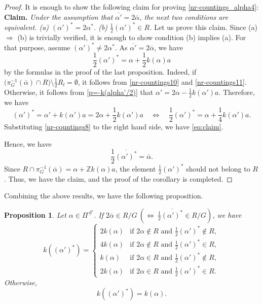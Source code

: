 \documentclass[11pt]{amsart}
\newcommand{\Z}{\mathbb{Z}}
\newcommand{\dc}{\,\underline{\mathrm{d}}^c}
\newtheorem{prop}[thm]{Proposition}%
\begin{document}
{\begin{proof}
It is enough to show the following claim for proving \eqref{nr-countings_alpha4}:
\vskip 1mm
\noindent
{\bf Claim.} {\it Under the assumption that
$\overline{\alpha'}= 2\overline{\alpha}$, 
the next two conditions are equivalent.
\vskip 1mm
\noindent
{\rm (a)} $(\alpha')^\ast=2\alpha^\ast$.
\vskip 1mm
\noindent
{\rm (b)} $\frac12 (\alpha')^\ast \in R$.} 
\vskip 3mm
\noindent
Let us prove this claim. Since (a) $\Longrightarrow$ (b) is trivially verified, it is enough 
to show condition (b) implies (a). For that purpose, assume 
$(\alpha')^\ast\ne 2\alpha^\ast$. As
$\overline{\alpha'}= 2\overline{\alpha}$, we have 
\begin{equation}\label{eq:claim}
\frac12 (\alpha')^*=\alpha+\frac12 k(\alpha)a
\end{equation}
by the formulas in the proof of the last proposition.
Indeed, if $\big(\pi_G^{-1}(\overline{\alpha})\cap R\big) \setminus \frac12 R_l=\emptyset$, it follows from \eqref{nr-countings10} and \eqref{nr-countings11}.
Otherwise, it follows from \eqref{p=-k(alpha'/2)} that
$\alpha'=2\alpha-\frac12 k(\alpha')a$. Therefore, we have
\[(\alpha')^*=\alpha'+k(\alpha')a=2\alpha+\dfrac12 k(\alpha')a\quad \Longleftrightarrow
\quad \frac12 (\alpha')^\ast=\alpha+\frac14k(\alpha')a.\]
Substituting \eqref{nr-countings8} to the right hand side, we have  
\eqref{eq:claim}. 

Hence, we have 
\[\frac12\overline{(\alpha')^\ast}=\overline{\alpha}.\] 
Since $R\cap \pi_G^{-1}(\overline{\alpha})=\alpha+\Z k(\alpha)a$,  the 
element $\frac12 (\alpha')^*$ should not belong to $R$. Thus, we have the
claim, and the proof of the corollary is completed.
\end{proof}

Combining the above results, we have the following proposition.

\begin{prop}\label{prop:countings-prime}
Let $\alpha\in \Pi^{\dc}$. If $2\overline{\alpha}\in R/G\ \left(\Longleftrightarrow\ 
\frac12 \overline{(\alpha')^\ast}\in R/G\right)$, we have 
\begin{equation}\label{countings-alpha-prime}
k((\alpha')^\ast)=\begin{cases}
2k(\alpha) & \text{if } 2\alpha\not\in R\text{ and } \frac12 (\alpha')^\ast\not\in R,\\
4k(\alpha) & \text{if } 2\alpha\not\in R\text{ and }\frac12 (\alpha')^\ast\in R,\\
k(\alpha) & \text{if } 2\alpha\in R\text{ and }\frac12 (\alpha')^\ast\not\in R,\\
2k(\alpha) & \text{if } 2\alpha\in R\text{ and }\frac12 (\alpha')^\ast\in R.
\end{cases}
\end{equation}
Otherwise, 
\begin{equation}
k((\alpha')^\ast)=k(\alpha). 
\end{equation}
\end{prop}

}
\end{document}
